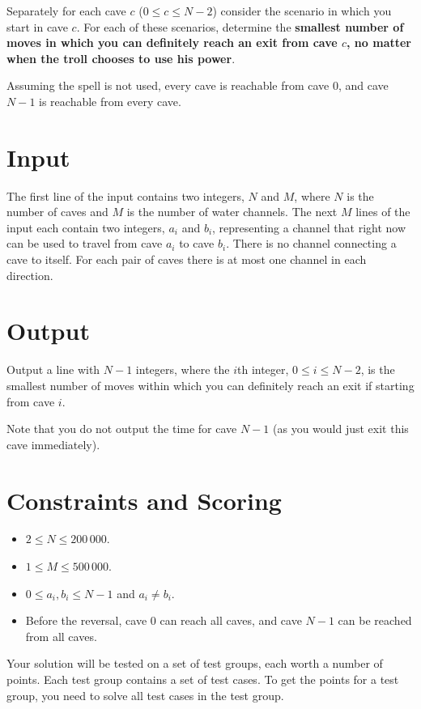 Separately for each cave $c$ ($0 \leq c \leq N-2$) consider the scenario in which you start in cave $c$. For each of these scenarios, determine the \textbf{smallest number of moves in which you can definitely reach an exit from cave $c$, no matter when the troll chooses to use his power}.

Assuming the spell is not used, every cave is reachable from cave $0$, and cave $N-1$ is reachable from every cave. 

\section*{Input}
The first line of the input contains two integers, $N$ and $M$, where $N$ is the number of caves and $M$ is the number of water channels.
The next $M$ lines of the input each contain two integers, $a_i$ and $b_i$,
representing a channel that right now can be used to travel from cave $a_i$ to cave $b_i$.
There is no channel connecting a cave to itself. For each pair of caves there is at most one channel in each direction.

\section*{Output}
Output a line with $N-1$ integers, where the $i$th integer, $0 \leq i \leq N-2$, is the smallest number of moves within which you can definitely reach an exit if starting from cave $i$.

Note that you do not output the time for cave $N - 1$ (as you would just exit this cave immediately).

\section*{Constraints and Scoring}
\begin{itemize}
\item $2 \leq N \leq 200\,000$.
\item $1 \leq M \leq 500\,000$.
\item $0 \leq a_i, b_i \leq N-1$ and $a_i \neq b_i$.
\item Before the reversal, cave $0$ can reach all caves, and cave $N-1$ can be reached from all caves.
\end{itemize}

Your solution will be tested on a set of test groups, each worth a number of points.
Each test group contains a set of test cases. To get the points for a test group, you need to
solve all test cases in the test group.


